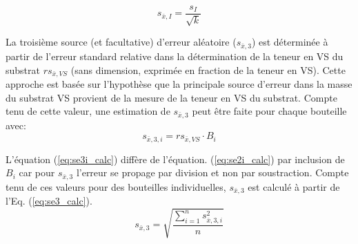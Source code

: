 \documentclass[]{article}
\begin{document}
\begin{equation}
  \label{eq:seI_calcb}
  s_{\bar{x},I} = \frac{s_{I} } {\sqrt{k}}
\end{equation}

La troisième source (et facultative) d'erreur aléatoire ($s_{\bar{x},3}$) est déterminée à partir de l'erreur standard relative dans la détermination de la teneur en VS du substrat $rs_{\bar{x},VS}$ (sans dimension, exprimée en fraction de la teneur en VS).
Cette approche est basée sur l'hypothèse que la principale source d'erreur dans la masse du substrat VS provient de la mesure de la teneur en VS du substrat.
Compte tenu de cette valeur, une estimation de $s_{\bar{x},3}$ peut être faite pour chaque bouteille avec:
\begin{equation}
  \label{eq:se3i_calc}
  s_{\bar{x},3,i} = rs_{\bar{x},VS} \cdot B_{i}
\end{equation}

L'équation (\ref{eq:se3i_calc}) diffère de l'équation. (\ref{eq:se2i_calc}) par inclusion de $B_{i}$ car pour $s_{\bar{x},3}$ l'erreur se propage par division et non par soustraction.
Compte tenu de ces valeurs pour des bouteilles individuelles, $s_{\bar{x},3}$ est calculé à partir de l'Eq. (\ref{eq:se3_calc}).
\begin{equation}
  \label{eq:se3_calc}
  s_{\bar{x},3} = \sqrt{\frac{\sum_{i=1} ^n s_{\bar{x},3,i}^2} {n}}
\end{equation}
\end{document}
